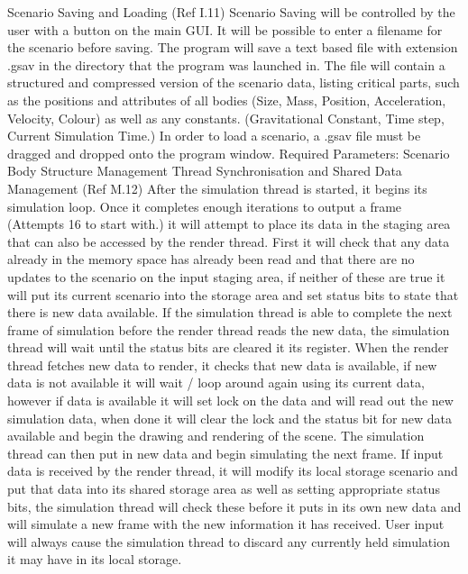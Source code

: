 Scenario Saving and Loading (Ref I.11)
Scenario Saving will be controlled by the user with a button on the main GUI. It will be possible to enter a filename for the scenario before saving.
The program will save a text based file with extension .gsav in the directory that the program was launched in.
The file will contain a structured and compressed version of the scenario data, listing critical parts, such as the positions and attributes of all bodies (Size, Mass, Position, Acceleration, Velocity, Colour) as well as any constants. (Gravitational Constant, Time step, Current Simulation Time.)
In order to load a scenario, a .gsav file must be dragged and dropped onto the program window.
Required Parameters:
Scenario Body Structure
Management
Thread Synchronisation and Shared Data Management (Ref M.12)
After the simulation thread is started, it begins its simulation loop. Once it completes enough iterations to output a frame (Attempts 16 to start with.) it will attempt to place its data in the staging area that can also be accessed by the render thread.
 First it will check that any data already in the memory space has already been read and that there are no updates to the scenario on the input staging area, if neither of these are true it will put its current scenario into the storage area and set status bits to state that there is new data available.
If the simulation thread is able to complete the next frame of simulation before the render thread reads the new data, the simulation thread will wait until the status bits are cleared it its register.
When the render thread fetches new data to render, it checks that new data is available, if new data is not available it will wait / loop around again using its current data, however if data is available it will set lock on the data and will read out the new simulation data, when done it will clear the lock and the status bit for new data available and begin the drawing and rendering of the scene.
The simulation thread can then put in new data and begin simulating the next frame.
If input data is received by the render thread, it will modify its local storage scenario and put that data into its shared storage area as well as setting appropriate status bits, the simulation thread will check these before it puts in its own new data and will simulate a new frame with the new information it has received.
User input will always cause the simulation thread to discard any currently held simulation it may have in its local storage.